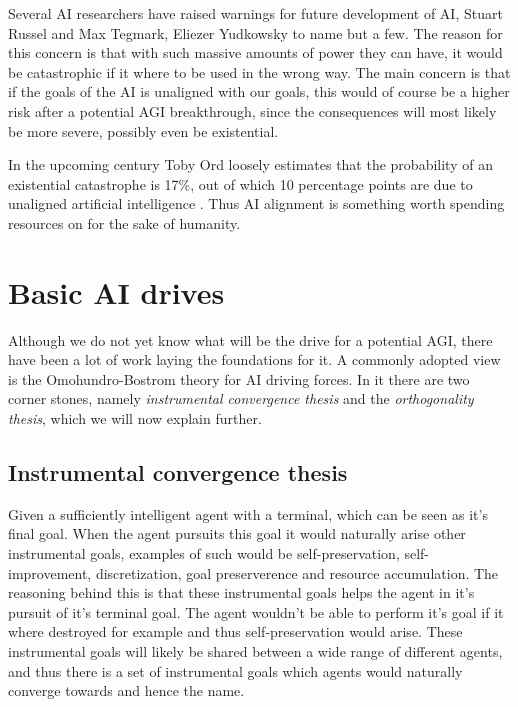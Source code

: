 \documentclass{report}
\theoremstyle{definition}
\begin{document}
Several AI researchers have raised warnings for future development of AI, Stuart Russel and Max Tegmark, Eliezer Yudkowsky to name but a few. The reason for this concern is that with such massive amounts of power they can have, it would be catastrophic if it where to be used in the wrong way. The main concern is that if the goals of the AI is unaligned with our goals, this would of course be a higher risk after a potential AGI breakthrough, since the consequences will most likely be more severe, possibly even be existential. 

In the upcoming century Toby Ord loosely estimates that the probability of an existential catastrophe is 17\%, out of which 10 percentage points are due to unaligned artificial intelligence \autocite{[precipice]}. Thus AI alignment is something worth spending resources on for the sake of humanity. 


\section{Basic AI drives}
Although we do not yet know what will be the drive for a potential AGI, there have been a lot of work laying the foundations for it. A commonly adopted view is the Omohundro-Bostrom theory for AI driving forces. In it there are two corner stones, namely \textit{instrumental convergence thesis} and the \textit{orthogonality thesis}, which we will now explain further.

\subsection{Instrumental convergence thesis}
Given a sufficiently intelligent agent with a terminal, which can be seen as it's final goal. When the agent pursuits this goal it would naturally arise other instrumental goals, examples of such would be self-preservation, self-improvement, discretization, goal preserverence and resource accumulation. The reasoning behind this is that these instrumental goals helps the agent in it's pursuit of it's terminal goal. The agent wouldn't be able to perform it's goal if it where destroyed for example and thus self-preservation would arise. These instrumental goals will likely be shared between a wide range of different agents, and thus there is a set of instrumental goals which agents would naturally converge towards and hence the name. 
\end{document}
